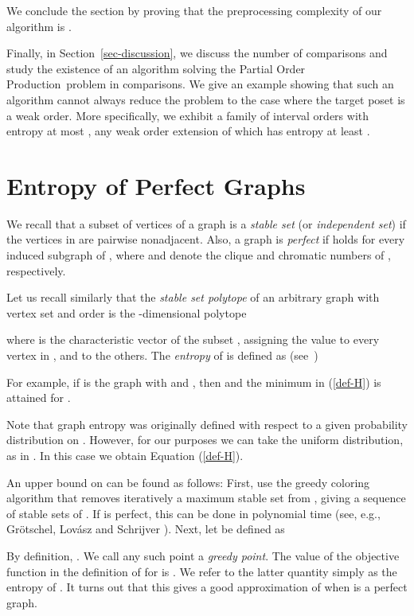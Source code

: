 \documentclass[12pt,oneside]{article}
\newcommand{\partsort}{{\sc Partial Order Production}}
\begin{document}
We conclude the section by proving that the preprocessing complexity of our algorithm is .\smallskip

Finally, in Section~\ref{sec-discussion}, we discuss {the number of comparisons and study} the existence of an algorithm solving the \partsort\ problem in  comparisons. We give an example showing that such an algorithm cannot always reduce the problem to the case where the target poset is a weak order. More specifically, we exhibit a family of interval orders with entropy at most , any weak order extension of which has entropy at least .

\section{Entropy of Perfect Graphs}
\label{sec-perfect-graphs}
We recall that a subset  of vertices of a graph is a \emph{stable set} (or {\em independent set}) if the vertices in  are pairwise nonadjacent. Also, a graph  is {\em perfect} if  holds for every induced
subgraph  of , where  and  denote the
clique and chromatic numbers of , respectively.

Let us recall similarly that the {\em stable set polytope\/} of an arbitrary graph  with vertex set  and order  is the -dimensional polytope

where  is the characteristic vector of the subset , assigning the value  to every vertex in , and  to the others. The {\em entropy\/} of  is defined as (see~\cite{K73,CKLMS90})

For example, if  is the graph with  and , then  and the minimum in (\ref{def-H}) is attained for .

Note that graph entropy was originally defined with respect to a given probability distribution on . However, for our purposes we can take the uniform distribution, as in \cite{KK95}. In this case we obtain Equation (\ref{def-H}).

An upper bound on  can be found as follows: First, use the greedy coloring algorithm that removes iteratively a maximum stable set from , giving a sequence  of stable sets of . If  is perfect, this can be done in polynomial time (see, e.g., Gr\"otschel, Lov\'asz and Schrijver \cite{GLS93}). Next, let  be defined as

By definition, . We call any such point  a {\em greedy point}. The value of the objective function in the definition of  for  is . We refer to the latter quantity simply as the entropy of .
It turns out that this gives a good approximation of  when  is a perfect graph.
\end{document}
